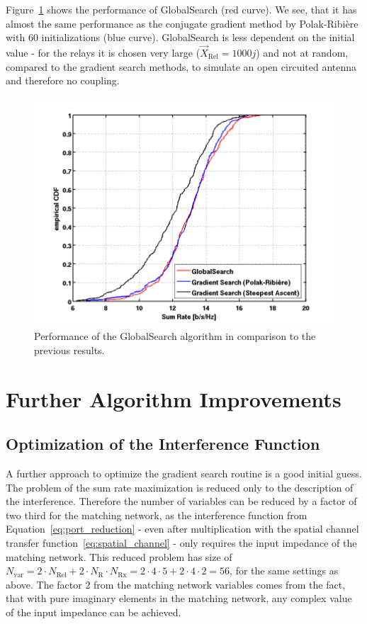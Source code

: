 Figure~\ref{fig:globals} shows the performance of GlobalSearch (red curve).
We see, that it has almost the same performance as the conjugate gradient method by Polak-Ribi\`{e}re with 60 initializations (blue curve).
GlobalSearch is less dependent on the initial value - for the relays it is chosen very large ($\vec{X}_{\text{Rel}} = 1000j$) and not at random, compared to the gradient search methods, to simulate an open circuited antenna and therefore no coupling.
\begin{figure}[h]
\centering
  \includegraphics[width=0.7\linewidth]{images/Globalscomparison_edited.png}
\caption{Performance of the GlobalSearch algorithm in comparison to the previous results.}
\label{fig:globals}
\end{figure}

\section{Further Algorithm Improvements}

\subsection{Optimization of the Interference Function}
\label{sec:preoptimization}
A further approach to optimize the gradient search routine is a good initial guess.
The problem of the sum rate maximization is reduced only to the description of the interference.
Therefore the number of variables can be reduced by a factor of two third for the matching network, as the interference function from Equation~\eqref{eq:port_reduction} - even after multiplication with the spatial channel transfer function~\eqref{eq:spatial_channel} - only requires the input impedance of the matching network.
This reduced problem has size of $N_\text{var} =  2\cdot N_\text{Rel}+2\cdot N_\text{R}\cdot N_\text{Rx} = 2\cdot 4\cdot 5 + 2\cdot 4\cdot 2 = 56$, for the same settings as above.
The factor 2 from the matching network variables comes from the fact, that with pure imaginary elements in the matching network, any complex value of the input impedance can be achieved.

